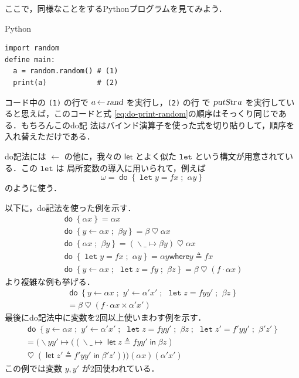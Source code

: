 \documentclass[a5paper,twoside,fleqn,draft]{jsbook}
\newcommand{\programminglanguage}[1]{\textsf{#1}}
\newcommand{\python}{\programminglanguage{Python}}
\newcommand{\code}[1]{\texttt{#1}}
\newenvironment{pythoncode}{\begin{itembox}[r]{\python}}{\end{itembox}}
\newcommand{\mKeyword}[1]{\mathsf{#1}}
\newcommand{\mVarKeyword}[1]{\texttt{#1}}
\newcommand{\mDoKeyword}{\mKeyword{do}}
\newcommand{\mDoLetKeyword}{\mVarKeyword{let}}
\newcommand{\mInKeyword}{\mKeyword{in}}
\newcommand{\mLetKeyword}{\mKeyword{let}}
\newcommand{\mWhereKeyword}{\mKeyword{where}}
\DeclareMathOperator{\mDoKW}{\mDoKeyword}
\DeclareMathOperator{\mLet}{\mLetKeyword}
\DeclareMathOperator{\mLetIn}{\mInKeyword}
\newcommand{\mAction}[1]{\textsl{#1}}
\DeclareMathOperator{\mPutStr}{\mAction{putStr}}
\DeclareMathOperator{\mRand}{\mAction{rand}}
\DeclareMathOperator{\mAppMap}{\times}
\DeclareMathOperator{\mBind}{\heartsuit}
\DeclareMathOperator{\mDoEq}{\leftarrow}
\DeclareMathOperator{\mDoLetEq}{\mVarKeyword{=}}
\DeclareMathOperator{\mDoNext}{;\;}
\DeclareMathOperator{\mLambda}{\backslash}
\DeclareMathOperator{\mLambdaArrow}{\mapsto}
\DeclareMathOperator{\mLetEq}{\triangleq}
\DeclareMathOperator{\mMap}{\cdot}
\newcommand{\mDo}[1]{\mDoKW\left\{#1\right\}}
\newcommand{\mDoLet}[2]{\mathop{\mDoLetKeyword}#1\mDoLetEq#2}
\newcommand{\mLambdaEXP}[2]{\mLambda{#1}\mLambdaArrow{#2}} %
\newcommand{\mLetInEXP}[3]{\mLet#1\mLetEq#2\mLetIn{#3}} %
\newcommand{\mWhereIsEXP}[2]{\mathbin{\mWhereKeyword}#1\mLetEq#2} %
\begin{document}
ここで，同様なことをする\python プログラムを見てみよう．
\begin{pythoncode}
\begin{verbatim}
import random
define main:
  a = random.random() # (1)
  print(a)            # (2)
\end{verbatim}
\end{pythoncode}
コード中の \code{(1)} の行で $a\mDoEq\mRand$ を実行し，\code{(2)} の行
で $\mPutStr a$ を実行していると思えば，このコードと式
\eqref{eq:do-print-random}の順序はそっくり同じである．もちろんこのdo記
法はバインド演算子を使った式を切り貼りして，順序を入れ替えただけである．

do記法には $\mDoEq$ の他に，我々の $\mLetKeyword$ とよく似た
$\mDoLetKeyword$ という構文が用意されている．この $\mDoLetKeyword$ は
局所変数の導入に用いられて，例えば
\begin{equation}
\omega=\mDo{\mDoLet{y}{fx}\mDoNext\alpha y}
\end{equation}
のように使う．

以下に，do記法を使った例を示す．
\begin{gather}
\mDo{\alpha x}=\alpha x\\
\mDo{y\mDoEq\alpha x\mDoNext\beta y}=\beta\mBind\alpha x\\
\mDo{\alpha x\mDoNext\beta y}=(\mLambdaEXP{\_}{\beta y})\mBind \alpha x\label{eq:do-alpha-beta}\\
\mDo{\mDoLet{y}{fx}\mDoNext\alpha y}=\alpha y\mWhereIsEXP{y}{fx}\\
\mDo{y\mDoEq\alpha x\mDoNext\mDoLet{z}{fy}\mDoNext\beta z}
=\beta\mBind{}(f\mMap\alpha x)
\end{gather}
より複雑な例も挙げる．
\begin{multline}
\mDo{y\mDoEq\alpha x\mDoNext y'\mDoEq\alpha'x'\mDoNext\mDoLet{z}{fyy'}
\mDoNext\beta z}\\
=\beta\mBind{}(f\mMap\alpha x\mAppMap\alpha'x')
\end{multline}
最後にdo記法中に変数を2回以上使いまわす例を示す．
\begin{multline}
\mDo{y\mDoEq\alpha x\mDoNext y'\mDoEq\alpha'x'\mDoNext\mDoLet{z}{fyy'}\mDoNext\beta z\mDoNext\mDoLet{z'}{f'yy'}\mDoNext\beta'z'}\\
=(\mLambda yy'\mLambdaArrow{}((\mLambdaEXP{\_}{\mLetInEXP{z}{fyy'}{\beta z}})\\
\mBind{}(\mLetInEXP{z'}{f'yy'}{\beta'z'}))) (\alpha x)(\alpha'x')
\end{multline}
この例では変数 $y,y'$ が2回使われている．
\end{document}
